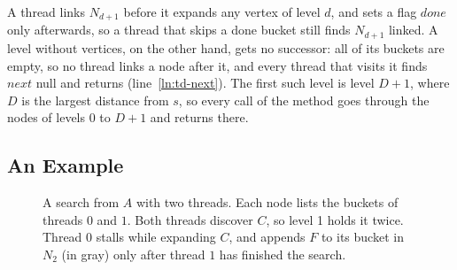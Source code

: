 A thread links $N_{d+1}$ before it expands any vertex of level $d$, and sets a flag $\mathit{done}$ only afterwards, so a thread that skips a done bucket still finds $N_{d+1}$ linked. A level without vertices, on the other hand, gets no successor: all of its buckets are empty, so no thread links a node after it, and every thread that visits it finds $\mathit{next}$ null and returns (line~\ref{ln:td-next}). The first such level is level $D+1$, where $D$ is the largest distance from $s$, so every call of the method goes through the nodes of levels $0$ to $D+1$ and returns there.

\subsection{An Example}
\label{sec:td-example}

\begin{figure}
    \centering

    \vspace{0.3cm}

    \caption{A search from $A$ with two threads. Each node lists the buckets of threads $0$ and $1$. Both threads discover $C$, so level 1 holds it twice. Thread $0$ stalls while expanding $C$, and appends $F$ to its bucket in $N_2$ (in gray) only after thread $1$ has finished the search.}
    \label{fig:td-example}
\end{figure}

